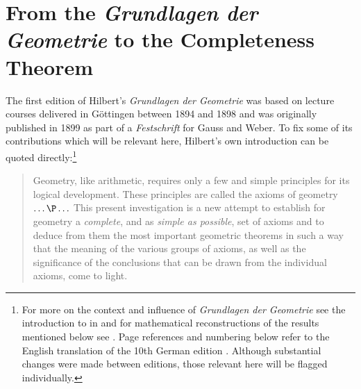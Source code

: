 \documentclass[11pt,fleqn,leqno]{article}
\begin{document}
\section{From the \textsl{Grundlagen der Geometrie} to the Completeness Theorem}

The first edition of Hilbert's \textsl{Grundlagen der Geometrie} was based on lecture courses delivered in G\"ottingen between 1894 and 1898 and was originally published in 1899 as part of a \textsl{Festschrift} for Gauss and Weber.  To fix some of its contributions which will be relevant here, Hilbert's own introduction can be quoted directly:\footnote{For more on the context and influence of  \textsl{Grundlagen der Geometrie} see the introduction to \citep{Hilbert1899} in \citep{Hilbert2004} and for mathematical reconstructions of the results mentioned below see \citep{Hartshorne2000}.  Page references and numbering below refer to the English translation of the 10th German edition \citep{Hilbert1971}.  Although substantial changes were made between editions, those relevant here will be flagged individually.}
\begin{quote}
{\footnotesize
Geometry, like arithmetic, requires only a few and simple principles for its logical development. These principles are called the axioms of geometry $\ldots \P \ldots$ This present investigation is a new attempt to establish for geometry a \textsl{complete}, and as \textsl{simple as possible}, set of axioms and to deduce from them the most important geometric theorems in such a way that the meaning of the various groups of axioms, as well as the significance of the conclusions that can be drawn from the individual axioms, come to light.  \\ \hspace*{1ex} \hfill \citep[p. 2]{Hilbert1971}}
\end{quote}  
\end{document}
